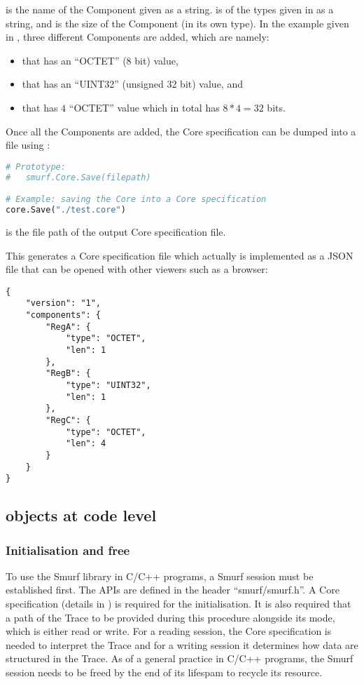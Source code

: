  is the name of the Component given as a string.  is of the types given in  as a string, and  is the size of the Component (in its own type). In the example given in , three different Components are added, which are namely:
\begin{itemize}
	\item {} that has an ``OCTET'' (8 bit) value, 
	\item {} that has an ``UINT32'' (unsigned 32 bit) value, and 
	\item {} that has $4$ ``OCTET'' value which in total has $8 * 4 =32$ bits.
\end{itemize}

Once all the Components are added, the Core specification can be dumped into a file using :
\begin{lstlisting}[language=Python,caption={smurf.Core.Save()\label{api:Core.SaveP}}]
# Prototype:
#	smurf.Core.Save(filepath)

# Example: saving the Core into a Core specification
core.Save("./test.core")
\end{lstlisting}

 is the file path of the output Core specification file.

This generates a Core specification file which actually is implemented as a JSON file that can be opened with other viewers such as a browser:
\begin{lstlisting}[caption={test.core\label{test.core}}]
{
	"version": "1",
	"components": {
		"RegA": {
			"type": "OCTET",
			"len": 1
		},
		"RegB": {
			"type": "UINT32",
			"len": 1
		},
		"RegC": {
			"type": "OCTET",
			"len": 4
		}
	}
}
\end{lstlisting}




\subsection{\smurf objects at code level}
\subsubsection{Initialisation and free}
To use the Smurf library in C/C++ programs, a Smurf session must be established first. The APIs are defined in the header ``smurf/smurf.h''.
A Core specification (details in ) is required for the initialisation. It is also required that a path of the Trace to be provided during this procedure alongside its mode, which is either read or write. For a reading session, the Core specification is needed to interpret the Trace and for a writing session it determines how data are structured in the Trace. As of a general practice in C/C++ programs, the Smurf session needs to be freed by the end of its lifespam to recycle its resource.

